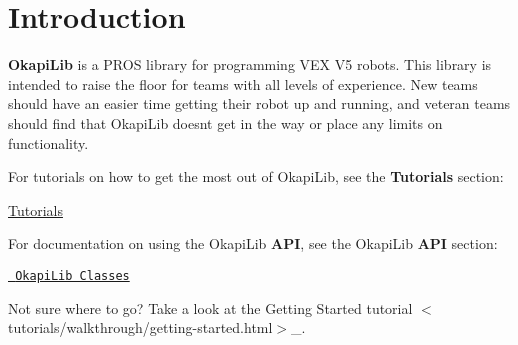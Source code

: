 \hypertarget{index_intro_sec}{}\section{Introduction}\label{index_intro_sec}
{\bfseries{Okapi\+Lib}} is a P\+R\+OS library for programming V\+EX V5 robots. This library is intended to raise the floor for teams with all levels of experience. New teams should have an easier time getting their robot up and running, and veteran teams should find that Okapi\+Lib doesn\textquotesingle{}t get in the way or place any limits on functionality.

For tutorials on how to get the most out of Okapi\+Lib, see the {\bfseries{Tutorials}} section\+:

\mbox{\hyperlink{md_docs_tutorials_index}{Tutorials}}

For documentation on using the Okapi\+Lib {\bfseries{A\+PI}}, see the Okapi\+Lib {\bfseries{A\+PI}} section\+:

\href{annotated.html}{\texttt{ Okapi\+Lib Classes}}

Not sure where to go? Take a look at the {\ttfamily Getting Started tutorial $<$tutorials/walkthrough/getting-\/started.\+html$>$}\+\_\+. 